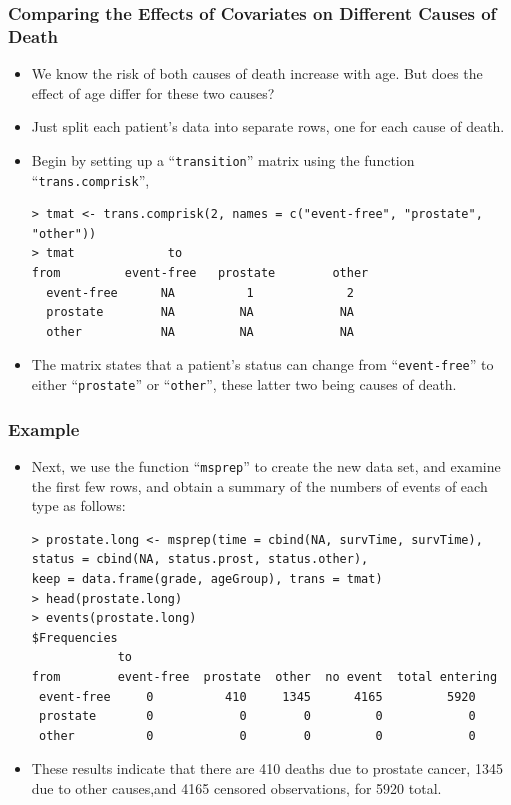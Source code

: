 \documentclass{beamer}
\begin{document}
\pagebreak
\begin{frame}[fragile]
\frametitle{Comparing the Effects of Covariates on Different Causes of Death}
\begin{itemize}
\item We know the risk of both causes of death increase with age. But does the effect of age differ for these two causes?
\item Just split each patient's data into separate rows, one for each cause of death.
\item Begin by setting up a ``\texttt{transition}'' matrix using the function ``\texttt{trans.comprisk}'', 
\begin{Verbatim}
> tmat <- trans.comprisk(2, names = c("event-free", "prostate", 
"other"))
> tmat             to
from         event-free   prostate        other 
  event-free      NA          1             2
  prostate        NA         NA            NA
  other           NA         NA            NA                   
\end{Verbatim}  
\item The matrix states that a patient's status can change from ``\texttt{event-free}'' to either ``\texttt{prostate}'' or ``\texttt{other}'', these latter two being causes of death.
\end{itemize}
\end{frame}


\pagebreak
\begin{frame}[fragile]
\frametitle{Example}
\begin{itemize}
\item Next, we use the function ``\texttt{msprep}'' to create the new data set, and examine the first few rows, and obtain a summary of the numbers of events of each type as follows:
\begin{Verbatim}
> prostate.long <- msprep(time = cbind(NA, survTime, survTime),
status = cbind(NA, status.prost, status.other),
keep = data.frame(grade, ageGroup), trans = tmat)
> head(prostate.long)
> events(prostate.long)
$Frequencies
            to
from        event-free  prostate  other  no event  total entering
 event-free     0          410     1345      4165         5920
 prostate       0            0        0         0            0
 other          0            0        0         0            0
\end{Verbatim}  
\item These results indicate that there are 410 deaths due to prostate cancer, 1345 due to other causes,and 4165 censored observations, for 5920 total.
\end{itemize}
\end{frame}
\end{document}
